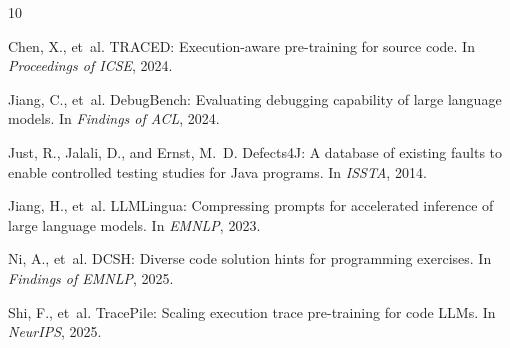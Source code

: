 \documentclass[11pt]{article}
\begin{document}

\begin{thebibliography}{10}

Chen, X., et~al.
\newblock TRACED: Execution-aware pre-training for source code.
\newblock In \emph{Proceedings of ICSE}, 2024.

Jiang, C., et~al.
\newblock DebugBench: Evaluating debugging capability of large language models.
\newblock In \emph{Findings of ACL}, 2024.

Just, R., Jalali, D., and Ernst, M.~D.
\newblock Defects4J: A database of existing faults to enable controlled testing studies for Java programs.
\newblock In \emph{ISSTA}, 2014.

Jiang, H., et~al.
\newblock LLMLingua: Compressing prompts for accelerated inference of large language models.
\newblock In \emph{EMNLP}, 2023.

Ni, A., et~al.
\newblock DCSH: Diverse code solution hints for programming exercises.
\newblock In \emph{Findings of EMNLP}, 2025.

Shi, F., et~al.
\newblock TracePile: Scaling execution trace pre-training for code LLMs.
\newblock In \emph{NeurIPS}, 2025.

\end{thebibliography}
\end{document}
